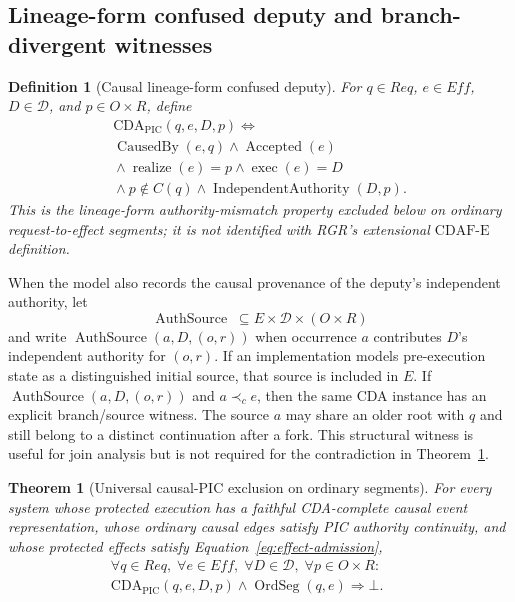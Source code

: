 \documentclass[10pt,twocolumn]{article}
\newcommand{\CDAF}{\mathrm{CDAF\text{-}E}}
\newcommand{\CausedBy}{\operatorname{CausedBy}}
\newcommand{\Realize}{\operatorname{realize}}
\newcommand{\Exec}{\operatorname{exec}}
\newcommand{\IndAuth}{\operatorname{IndependentAuthority}}
\newcommand{\Accepted}{\operatorname{Accepted}}
\newcommand{\hb}{\prec_{c}}
\newcommand{\OrdSeg}{\operatorname{OrdSeg}}
\newcommand{\AuthSource}{\operatorname{AuthSource}}
\newcommand{\CDApic}{\mathrm{CDA}_{\mathrm{PIC}}}
\newtheorem{definition}{Definition}
\newtheorem{theorem}{Theorem}
\begin{document}
\subsection{Lineage-form confused deputy and branch-divergent witnesses}

\begin{definition}[Causal lineage-form confused deputy]
\label{def:cda-pic}
For $q\in Req$, $e\in Eff$, $D\in\mathcal D$, and
$p\in O\times R$, define
\begin{equation}
\begin{gathered}
  \CDApic(q,e,D,p)\Longleftrightarrow\\
  \CausedBy(e,q)\land\Accepted(e)\\
  {}\land\Realize(e)=p\land\Exec(e)=D\\
  {}\land p\notin C(q)\land\IndAuth(D,p).
\end{gathered}
\label{eq:cda-def}
\end{equation}
This is the lineage-form authority-mismatch property excluded below on ordinary
request-to-effect segments; it is not identified with RGR's extensional
$\CDAF$ definition.
\end{definition}

When the model also records the causal provenance of the deputy's independent
authority, let
\begin{equation}
  \AuthSource\;\subseteq E\times\mathcal D\times(O\times R)
\end{equation}
and write $\AuthSource(a,D,(o,r))$ when occurrence $a$ contributes $D$'s
independent authority for $(o,r)$.  If an implementation models pre-execution
state as a distinguished initial source, that source is included in $E$.  If $\AuthSource(a,D,(o,r))$ and $a\hb e$, then the same
CDA instance has an explicit branch/source witness.  The source $a$ may share
an older root with $q$ and still belong to a distinct continuation after a
fork.  This structural witness is useful for join analysis but is not required
for the contradiction in Theorem~\ref{thm:total-cda}.

\begin{theorem}[Universal causal-PIC exclusion on ordinary segments]
\label{thm:total-cda}
For every system whose protected execution has a faithful CDA-complete causal
event representation, whose ordinary causal edges satisfy PIC authority
continuity, and whose protected effects satisfy
Equation~\eqref{eq:effect-admission},
\begin{equation}
\begin{aligned}
  \forall q\in Req,\;\forall e\in Eff,\;\forall D\in\mathcal D,\;
  \forall p\in O\times R:\qquad\\
  \CDApic(q,e,D,p)\land\OrdSeg(q,e)\Longrightarrow\bot.
\end{aligned}
\label{eq:cda-ordinary-impossible}
\end{equation}
\end{theorem}
\end{document}
